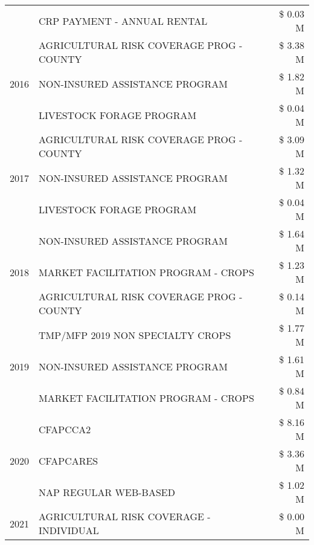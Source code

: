 \begin{tabular}{llr}
 & CRP PAYMENT - ANNUAL RENTAL & \$ 0.03 M \\
\cline{1-3}
\multirow[t]{3}{*}{2016} & AGRICULTURAL RISK COVERAGE PROG - COUNTY & \$ 3.38 M \\
 & NON-INSURED ASSISTANCE PROGRAM & \$ 1.82 M \\
 & LIVESTOCK FORAGE PROGRAM & \$ 0.04 M \\
\cline{1-3}
\multirow[t]{3}{*}{2017} & AGRICULTURAL RISK COVERAGE PROG - COUNTY & \$ 3.09 M \\
 & NON-INSURED ASSISTANCE PROGRAM & \$ 1.32 M \\
 & LIVESTOCK FORAGE PROGRAM & \$ 0.04 M \\
\cline{1-3}
\multirow[t]{3}{*}{2018} & NON-INSURED ASSISTANCE PROGRAM & \$ 1.64 M \\
 & MARKET FACILITATION PROGRAM - CROPS & \$ 1.23 M \\
 & AGRICULTURAL RISK COVERAGE PROG - COUNTY & \$ 0.14 M \\
\cline{1-3}
\multirow[t]{3}{*}{2019} & TMP/MFP 2019 NON SPECIALTY CROPS & \$ 1.77 M \\
 & NON-INSURED ASSISTANCE PROGRAM & \$ 1.61 M \\
 & MARKET FACILITATION PROGRAM - CROPS & \$ 0.84 M \\
\cline{1-3}
\multirow[t]{3}{*}{2020} & CFAPCCA2 & \$ 8.16 M \\
 & CFAPCARES & \$ 3.36 M \\
 & NAP REGULAR WEB-BASED & \$ 1.02 M \\
\cline{1-3}
2021 & AGRICULTURAL RISK COVERAGE - INDIVIDUAL & \$ 0.00 M \\
\cline{1-3}
\bottomrule
\end{tabular}
